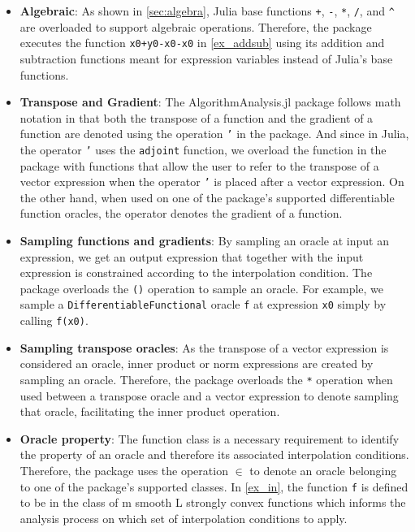 \begin{itemize}
\item \textbf{Algebraic}: As shown in \cref{sec:algebra}, Julia base functions \texttt{+}, \texttt{-}, \texttt{*}, \texttt{/}, and \texttt{\textasciicircum} are overloaded to support algebraic operations. Therefore, the package executes the function \texttt{x0+y0-x0-x0} in \cref{ex_addsub} using its addition and subtraction functions meant for expression variables instead of Julia's base functions.
\item \textbf{Transpose and Gradient}: The AlgorithmAnalysis.jl package follows math notation in that both the transpose of a function and the gradient of a function are denoted using the operation \texttt{'} in the package. And since in Julia, the operator \texttt{'} uses the \texttt{adjoint} function, we overload the function in the package with functions that allow the user to refer to the transpose of a vector expression when the operator \texttt{'} is placed after a vector expression. On the other hand, when used on one of the package's supported differentiable function oracles, the operator denotes the gradient of a function.
\item \textbf{Sampling functions and gradients}: By sampling an oracle at input an expression, we get an output expression that together with the input expression is constrained according to the interpolation condition. The package overloads the \texttt{()} operation to sample an oracle. For example, we sample a \texttt{DifferentiableFunctional} oracle \texttt{f} at expression \texttt{x0} simply by calling \texttt{f(x0)}.
\item \textbf{Sampling transpose oracles}: As the transpose of a vector expression is considered an oracle, inner product or norm expressions are created by sampling an oracle. Therefore, the package overloads the \texttt{*} operation when used between a transpose oracle and a vector expression to denote sampling that oracle, facilitating the inner product operation.
\item \textbf{Oracle property}: The function class is a necessary requirement to identify the property of an oracle and therefore its associated interpolation conditions. Therefore, the package uses the operation \texttt{$\in$} to denote an oracle belonging to one of the package's supported classes. In \cref{ex_in}, the function \texttt{f} is defined to be in the class of m smooth L strongly convex functions which informs the analysis process on which set of interpolation conditions to apply.
\end{itemize}

